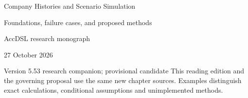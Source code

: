\documentclass[11pt,a4paper]{report}
\begin{document}
\hypersetup{pageanchor=false}
\begin{titlepage}
{\Huge Company Histories and Scenario Simulation\par}
\vspace{12mm}
{\Large Foundations, failure cases, and proposed methods\par}
\vspace{8mm}
AccDSL research monograph\par 27 October 2026\par Version 5.53 research companion; provisional candidate
\vfill
This reading edition and the governing proposal use the same new chapter sources. Examples distinguish exact calculations, conditional assumptions and unimplemented methods.
\end{titlepage}
\hypersetup{pageanchor=true}
\tableofcontents
\clearpage{}


























\clearpage\label{sim:body-end}

\begingroup\raggedright
\endgroup
\end{document}
